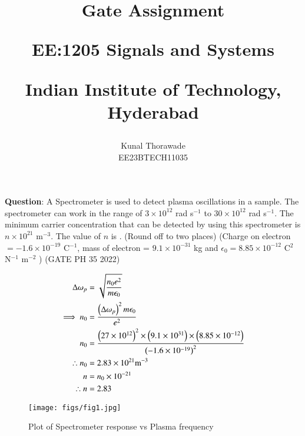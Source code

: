 \documentclass[journal,12pt,onecolumn]{IEEEtran}
\theoremstyle{remark}
\begin{document}
%




\vspace{3cm}

\title{
	Gate Assignment

	\large{EE:1205 Signals and Systems}

	Indian Institute of Technology, Hyderabad
}
\author{Kunal Thorawade

EE23BTECH11035
}	
\maketitle



\bigskip
 
 \renewcommand{\thefigure}{\theenumi}
 \renewcommand{\thetable}{\arabic{table}}
 \renewcommand{\thefigure}{\arabic{figure}}

 \textbf{Question}:
 A Spectrometer is used to detect plasma oscillations in a sample. The spectrometer 
 can work in the range of $3 \times 10^{12}$ rad s$^{-1}$ to $30 \times 10^{12}$ rad s$^{-1}$. The minimum carrier concentration that can be detected by using this spectrometer is $n \times 10^{21}$ m$^{-3}$. The value of $n$ is \underline{\hspace{2cm}}. (Round off to two places)
 (Charge on electron $= -1.6 \times 10^{-19} $ C$^{-1}$, mass of electron = $9.1 \times 10^{-31}$ kg and $\epsilon_0 = 8.85 \times 10^{-12}$ C$^{2}$ N$^{-1}$ m$^{-2}$ ) \hfill(GATE PH 35 2022)\\
 \solution 
 
 \begin{align}
	     \Delta\omega_p &= \sqrt{\frac{n_0e^2}{m\epsilon_0}} \\
	         \implies n_0 &= \frac{\left(\Delta\omega_p\right)^2m\epsilon_0}{e^2} \\
		     n_0 &= \frac{\left(27 \times 10^{12}\right)^2 \times \left(9.1 \times 10^{31} \right)\times \left(8.85 \times 10^{-12}\right)}{\left(-1.6 \times 10^{-19}\right)^2} \\
		         \therefore n_0 &= 2.83 \times 10^{21} \text{m}^{-3} \\
			     n &= n_0 \times 10^{-21} \\
			         \therefore n &= 2.83
 \end{align}
 \begin{figure}[ht]
	     \centering
	         \texttt{[image: figs/fig1.jpg]}
		     \caption{Plot of Spectrometer response vs Plasma frequency}
		         \label{fig2.PH.35}
 \end{figure}
\end{document}
